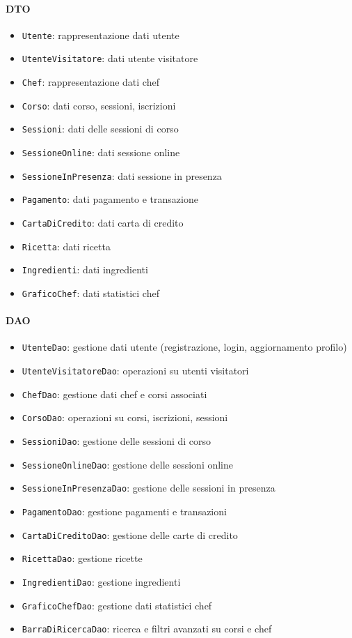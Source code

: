 \paragraph{DTO}
\begin{itemize}
    \item \texttt{Utente}: rappresentazione dati utente
    \item \texttt{UtenteVisitatore}: dati utente visitatore
    \item \texttt{Chef}: rappresentazione dati chef
    \item \texttt{Corso}: dati corso, sessioni, iscrizioni
    \item \texttt{Sessioni}: dati delle sessioni di corso
    \item \texttt{SessioneOnline}: dati sessione online
    \item \texttt{SessioneInPresenza}: dati sessione in presenza
    \item \texttt{Pagamento}: dati pagamento e transazione
    \item \texttt{CartaDiCredito}: dati carta di credito
    \item \texttt{Ricetta}: dati ricetta
    \item \texttt{Ingredienti}: dati ingredienti
    \item \texttt{GraficoChef}: dati statistici chef
\end{itemize}

\paragraph{DAO}
\begin{itemize}
    \item \texttt{UtenteDao}: gestione dati utente (registrazione, login, aggiornamento profilo)
    \item \texttt{UtenteVisitatoreDao}: operazioni su utenti visitatori
    \item \texttt{ChefDao}: gestione dati chef e corsi associati
    \item \texttt{CorsoDao}: operazioni su corsi, iscrizioni, sessioni
    \item \texttt{SessioniDao}: gestione delle sessioni di corso
    \item \texttt{SessioneOnlineDao}: gestione delle sessioni online
    \item \texttt{SessioneInPresenzaDao}: gestione delle sessioni in presenza
    \item \texttt{PagamentoDao}: gestione pagamenti e transazioni
    \item \texttt{CartaDiCreditoDao}: gestione delle carte di credito
    \item \texttt{RicettaDao}: gestione ricette
    \item \texttt{IngredientiDao}: gestione ingredienti
    \item \texttt{GraficoChefDao}: gestione dati statistici chef
    \item \texttt{BarraDiRicercaDao}: ricerca e filtri avanzati su corsi e chef
\end{itemize}

